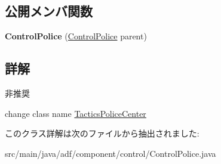 \subsection*{公開メンバ関数}
\begin{DoxyCompactItemize}
\item 
\hypertarget{classadf_1_1component_1_1control_1_1ControlPolice_a5f749280b92a7b6785bf6207f91834f8}{}\label{classadf_1_1component_1_1control_1_1ControlPolice_a5f749280b92a7b6785bf6207f91834f8} 
{\bfseries Control\+Police} (\hyperlink{classadf_1_1component_1_1control_1_1ControlPolice}{Control\+Police} parent)
\end{DoxyCompactItemize}


\subsection{詳解}
\begin{DoxyRefDesc}{非推奨}
\item[\hyperlink{deprecated__deprecated000012}{非推奨}]change class name \hyperlink{}{Tactics\+Police\+Center} \end{DoxyRefDesc}


このクラス詳解は次のファイルから抽出されました\+:\begin{DoxyCompactItemize}
\item 
src/main/java/adf/component/control/Control\+Police.\+java\end{DoxyCompactItemize}
